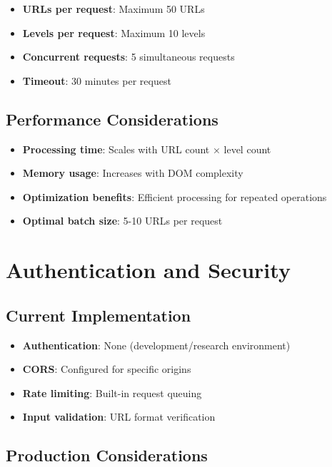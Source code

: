 \begin{itemize}
    \item \textbf{URLs per request}: Maximum 50 URLs
    \item \textbf{Levels per request}: Maximum 10 levels
    \item \textbf{Concurrent requests}: 5 simultaneous requests
    \item \textbf{Timeout}: 30 minutes per request
\end{itemize}

\subsection{Performance Considerations}
\label{subsec:performance-considerations}

\begin{itemize}
    \item \textbf{Processing time}: Scales with URL count × level count
    \item \textbf{Memory usage}: Increases with DOM complexity
    \item \textbf{Optimization benefits}: Efficient processing for repeated operations
    \item \textbf{Optimal batch size}: 5-10 URLs per request
\end{itemize}

\section{Authentication and Security}
\label{sec:authentication}

\subsection{Current Implementation}
\label{subsec:current-auth}

\begin{itemize}
    \item \textbf{Authentication}: None (development/research environment)
    \item \textbf{CORS}: Configured for specific origins
    \item \textbf{Rate limiting}: Built-in request queuing
    \item \textbf{Input validation}: URL format verification
\end{itemize}

\subsection{Production Considerations}
\label{subsec:production-security}

